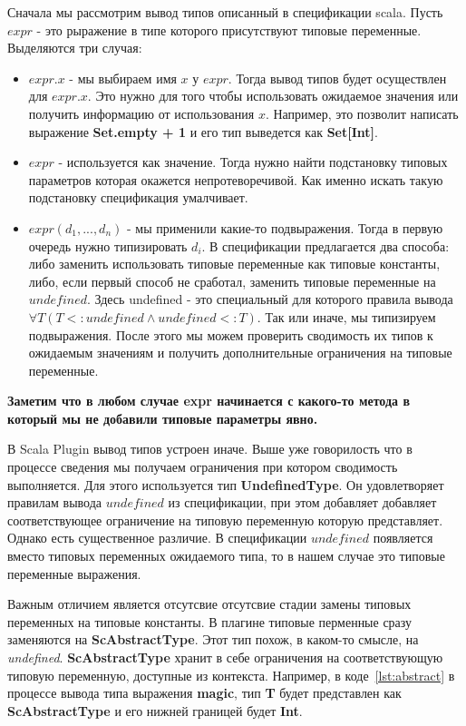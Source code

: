 Сначала мы рассмотрим вывод типов описанный в спецификации scala.
Пусть $expr$ - это рыражение в типе которого присутствуют типовые переменные.
Выделяются три случая:
\begin{itemize}
  \item $expr.x$ - мы выбираем имя $x$ у $expr$.
  Тогда вывод типов будет осуществлен для $expr.x$.
  Это нужно для того чтобы использовать ожидаемое значения или получить
  информацию от использования $x$.
  Например, это позволит написать выражение \textbf{Set.empty + 1} и его тип
  выведется как \textbf{Set[Int]}.
  \item $expr$ - используется как значение.
  Тогда нужно найти подстановку типовых параметров которая окажется
  непротеворечивой.
  Как именно искать такую подстановку спецификация умалчивает.
  \item $expr(d_1, ..., d_n)$ - мы применили какие-то подвыражения.
  Тогда в первую очередь нужно типизировать $d_i$.
  В спецификации предлагается два способа:
  либо заменить использовать типовые переменные как типовые константы,
  либо, если первый способ не сработал, заменить типовые переменные на $undefined$.
  Здесь undefined - это специальный для которого правила вывода
  $\forall T (T <: undefined \land undefined <: T)$.
  Так или иначе, мы типизируем подвыражения.
  После этого мы можем проверить сводимость их типов к ожидаемым значениям и
  получить дополнительные ограничения на типовые переменные.
\end{itemize}

\textbf{Заметим что в любом случае expr начинается с какого-то метода в который
мы не добавили типовые параметры явно.}

В Scala Plugin вывод типов устроен иначе.
Выше уже говорилость что в процессе сведения мы получаем ограничения при котором
сводимость выполняется.
Для этого используется тип \textbf{UndefinedType}.
Он удовлетворяет правилам вывода $undefined$ из спецификации, при этом добавляет
добавляет соответствующее ограничение на типовую переменную которую представляет.
Однако есть существенное различие.
В спецификации $undefined$ появляется вместо типовых переменных ожидаемого типа,
то в нашем случае это типовые переменные выражения.

Важным отличием является отсутсвие отсутсвие стадии замены типовых переменных на
типовые константы. В плагине типовые перменные сразу заменяются на
\textbf{ScAbstractType}.
Этот тип похож, в каком-то смысле, на \textit{undefined}.
\textbf{ScAbstractType} хранит в себе ограничения на соответствующую типовую
переменную, доступные из контекста.
Например, в коде~\ref{lst:abstract} в процессе вывода типа выражения
\textbf{magic}, тип \textbf{T} будет представлен как \textbf{ScAbstractType} и
его нижней границей будет \textbf{Int}.


